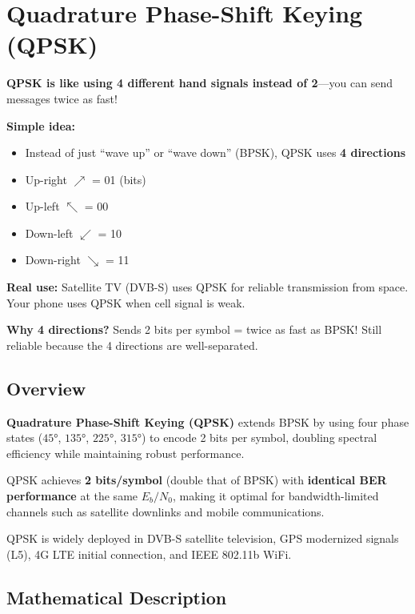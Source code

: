 \chapter{Quadrature Phase-Shift Keying (QPSK)}
\label{ch:qpsk}

\begin{nontechnical}
\textbf{QPSK is like using 4 different hand signals instead of 2}---you can send messages twice as fast!

\textbf{Simple idea:}
\begin{itemize}
\item Instead of just ``wave up'' or ``wave down'' (BPSK), QPSK uses \textbf{4 directions}
\item Up-right $\nearrow$ = 01 (bits)
\item Up-left $\nwarrow$ = 00
\item Down-left $\swarrow$ = 10
\item Down-right $\searrow$ = 11
\end{itemize}

\textbf{Real use:} Satellite TV (DVB-S) uses QPSK for reliable transmission from space. Your phone uses QPSK when cell signal is weak.

\textbf{Why 4 directions?} Sends 2 bits per symbol = twice as fast as BPSK! Still reliable because the 4 directions are well-separated.
\end{nontechnical}

\section{Overview}

\textbf{Quadrature Phase-Shift Keying (QPSK)} extends BPSK by using four phase states ($45°$, $135°$, $225°$, $315°$) to encode 2 bits per symbol, doubling spectral efficiency while maintaining robust performance.

\begin{keyconcept}
QPSK achieves \textbf{2 bits/symbol} (double that of BPSK) with \textbf{identical BER performance} at the same $E_b/N_0$, making it optimal for bandwidth-limited channels such as satellite downlinks and mobile communications.
\end{keyconcept}

QPSK is widely deployed in DVB-S satellite television, GPS modernized signals (L5), 4G LTE initial connection, and IEEE 802.11b WiFi.

\section{Mathematical Description}


